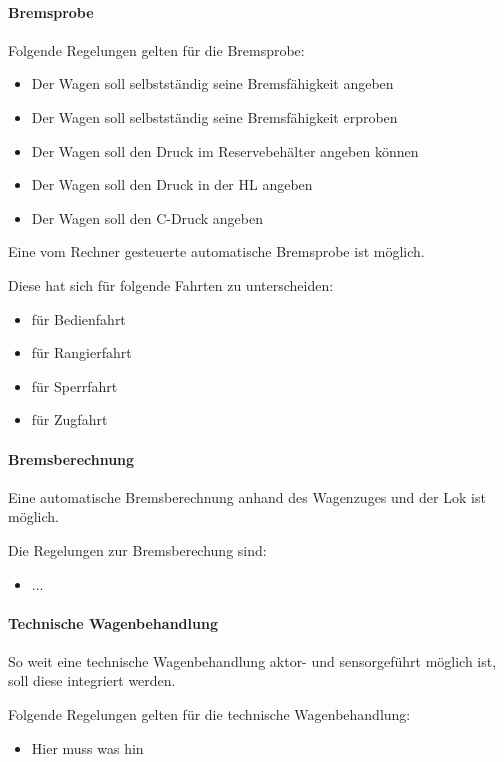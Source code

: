 \paragraph{Bremsprobe}
\begin{feat}
Folgende Regelungen gelten für die Bremsprobe:
\begin{itemize}
    \item Der Wagen soll selbstständig seine Bremsfähigkeit angeben
    \item Der Wagen soll selbstständig seine Bremsfähigkeit erproben
    \item Der Wagen soll den Druck im Reservebehälter angeben können
    \item Der Wagen soll den Druck in der \acrshort{HL} angeben
    \item Der Wagen soll den C-Druck angeben
\end{itemize}
\end{feat}
\begin{feat}
Eine vom Rechner gesteuerte automatische Bremsprobe ist möglich.
\end{feat}
\begin{rem} [zu Anf. 29] 
Diese hat sich für folgende Fahrten zu unterscheiden:
\begin{itemize}
    \item für Bedienfahrt
    \item für Rangierfahrt
    \item für Sperrfahrt
    \item für Zugfahrt
\end{itemize}
\end{rem}

\paragraph{Bremsberechnung}
\begin{feat}
Eine automatische Bremsberechnung anhand des Wagenzuges und der Lok ist möglich.
\end{feat}
\begin{rem} [zu Anf. 30]
Die Regelungen zur Bremsberechung sind:
\begin{itemize}
    \item ...
\end{itemize}
\end{rem}

\paragraph{Technische Wagenbehandlung}
\begin{feat}
So weit eine technische Wagenbehandlung aktor- und sensorgeführt möglich ist, soll diese integriert werden.
\end{feat}
\begin{feat}
Folgende Regelungen gelten für die technische Wagenbehandlung:
\begin{itemize}
    \item Hier muss was hin
\end{itemize}
\end{feat}

